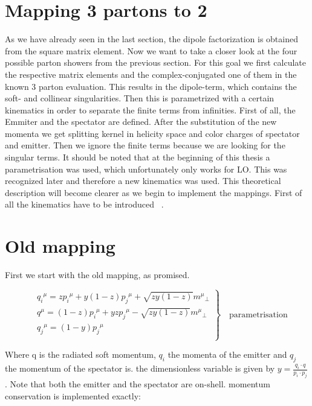 \section{Mapping 3 partons to 2}
As we have already seen in the last section, the dipole factorization is obtained from the square matrix element. Now we want to take a closer look at the four possible parton showers from the previous section. For this goal we first calculate the respective matrix elements and the complex-conjugated one of them in the known 3 parton evaluation. This results in the dipole-term, which contains the soft- and collinear singularities. Then this is parametrized with a certain kinematics in order to separate the finite terms from infinities. First of all, the Emmiter and the spectator are defined. After the substitution of the new momenta we get splitting kernel in helicity space and color charges of spectator and emitter. Then we ignore the finite terms because we are looking for the singular terms. It should be noted that at the beginning of this thesis a parametrisation was used, which unfortunately only works for LO. This was recognized later and therefore a new kinematics was used. 
This theoretical description will become clearer as we begin to implement the mappings. First of all the kinematics have to be introduced ~\cite{Platzer:2011dq, Platzer:2018pmd, Platzer:2009jq, Gieseke:2003rz}.
\section{Old mapping}
First we start with the old mapping, as promised. 
	
\begin{equation}
	\left.\begin{aligned}
	&{q_i}^{\mu} = z{p_i}^{\mu} + y(1-z){p_j}^{\mu} + \sqrt{zy(1-z)}{m^{\mu}}_{\bot} \\
	&{q}^{\mu}   = (1-z){p_i}^{\mu} + yz {p_j}^{\mu} - \sqrt{zy(1-z)}{m^{\mu}}_{\bot} \\
	&{q_j}^{\mu} = (1-y) {p_j}^{\mu} \\
		\end{aligned}
	\right\}
	\quad \text{parametrisation}
\end{equation}

Where q is the radiated soft momentum, $ q_i $ the momenta of the emitter and $ q_j $ the momentum of the spectator is.
the dimensionless variable is given by $ y = \frac{q_i \cdot q}{p_i \cdot p_j}$. Note that both the emitter and the spectator are on-shell.
momentum conservation is implemented exactly:

